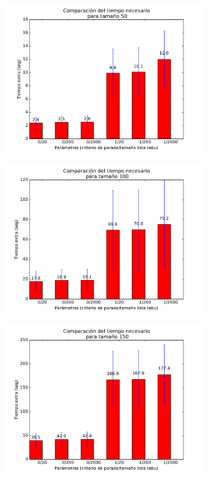 \begin{figure}[H]
 \centering
	\includegraphics[width=0.8\textwidth]{graficos/problema_6/tiempo0.pdf}
	\caption{}
	\label{fig:problema6-tiempo0}
\end{figure}

\begin{figure}[H]
 \centering
	\includegraphics[width=0.8\textwidth]{graficos/problema_6/tiempo1.pdf}
	\caption{}
	\label{fig:problema6-tiempo1}
\end{figure}

\begin{figure}[H]
 \centering
	\includegraphics[width=0.8\textwidth]{graficos/problema_6/tiempo2.pdf}
	\caption{}
	\label{fig:problema6-tiempo2}
\end{figure}

